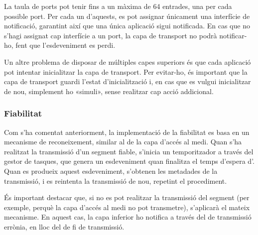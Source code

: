 \documentclass{tfgitic}[2024/07/01]
\begin{document}
{La taula de ports pot tenir fins a un màxima de 64 entrades, una per cada possible port. Per cada un d'aquests, es pot assignar únicament una interfície de notificació, garantint així que una única aplicació sigui notificada. En cas que no s'hagi assignat cap interfície a un port, la capa de transport no podrà notificar-ho, fent que l'esdeveniment es perdi.

Un altre problema de disposar de múltiples capes superiors és que cada aplicació pot intentar inicialitzar la capa de transport. Per evitar-ho, és important que la capa de transport guardi l'estat d'inicialització i, en cas que es vulgui inicialitzar de nou, simplement ho «simuli», sense realitzar cap acció addicional.

\subsubsection{Fiabilitat}
\label{subsubsec:transport_fiabilitat}
Com s'ha comentat anteriorment, la implementació de la fiabilitat es basa en un mecanisme de reconeixement, similar al de la capa d'accés al medi.
Quan s'ha realitzat la transmissió d'un segment fiable, s'inicia un temporitzador a través del gestor de tasques, que genera un esdeveniment quan finalitza el temps d'espera d'. Quan es produeix aquest esdeveniment, s'obtenen les metadades de la transmissió, i es reintenta la transmissió de nou, repetint el procediment.

És important destacar que, si no es pot realitzar la transmissió del segment (per exemple, perquè la capa d'accés al medi no pot transmetre), s'aplicarà el mateix mecanisme. En aquest cas, la capa inferior ho notifica a través del  de transmissió errònia, en lloc del de fi de transmissió.

}
\end{document}
